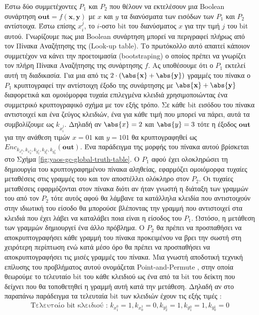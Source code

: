 Έστω δύο συμμετέχοντες $P_1$ και $P_2$ που θέλουν να εκτελέσουν μια Boolean συνάρτηση $\mathbf{out} = f(\mathbf{x}, \mathbf{y})$ με $x$ και $y$ τα διανύσματα των εισόδων των $P_1$ και $P_2$ αντίστοιχα. Έστω επίσης $x_i^j$, το $i$-οστο bit του διανύσματος $x$ για την τιμή $j$ του bit αυτού.  Γνωρίζουμε πως μια Boolean συνάρτηση μπορεί να περιγραφεί πλήρως από τον Πίνακα Αναζήτησης της (Look-up table). Το πρωτόκολλο αυτό απαιτεί κάποιον συμμετέχον να κάνει την προετοιμασία (bootstraping) ο οποίος πρέπει να γνωρίζει τον πλήρη Πίνακα Αναζήτησης της συνάρτησης $f$. Ας υποθέσουμε ότι ο $P_1$ εκτελεί αυτή τη διαδικασία. Για μια από τις $2 \cdot (\abs{\mathbf{x}} + \abs{\mathbf{y}})$ γραμμές του πίνακα ο $P_1$ κρυπτογραφεί την αντίστοιχη έξοδο της συνάρτησης με $ \abs{\mathbf{x}} + \abs{\mathbf{y}}$ διαφορετικά και ομοιόμορφα τυχαία επιλεγμένα κλειδιά χρησιμοποιώντας ένα συμμετρικό κρυπτογραφικό σχήμα με τον εξής τρόπο. Σε κάθε bit εισόδου του πίνακα αντιστοιχεί και ένα ζεύγος κλειδιών, ένα για κάθε τιμή που μπορεί να πάρει, αυτά τα συμβολίζουμε ως $k_{x_i^j}$. Δηλαδή αν $\abs{x}=2$ και $\abs{y}=3$ τότε η έξοδος $\mathbf{out}$ για την ανάθεση τιμών $x=01$ και $y=101$ θα κρυπτογραφηθεί ως $Enc_{k_{x_1^0}, k_{x_0^1}, k_{y_2^1}, k_{y_1^0}, k_{y_0^1}}(\mathbf{out})$. Ένα παράδειγμα της μορφής του πίνακα αυτού βρίσκεται στο Σχήμα \ref{fig:yaos-gc-global-truth-table}. Ο $P_1$ αφού έχει ολοκληρώσει τη δημιουργία του κρυπτογραφημένου πίνακα αληθείας, εφαρμόζει ομοιόμορφα τυχαίες μεταθέσεις στις γραμμές του και τον αποστέλλει ολόκληρο στον $P_2$. Οι τυχαίες μεταθέσεις εφαρμόζονται στον πίνακα διότι αν ήταν γνωστή η διάταξη των γραμμών του από τον $P_2$ τότε αυτός αφού θα λάμβανε τα κατάλληλα κλειδία που αντιστοιχούν στην ιδιωτική του είσοδο θα μπορούσε βλέποντας την γραμμή που αντιστοιχεί στα κλειδιά που έχει λάβει να καταλάβει ποια είναι η είσοδος του $P_1$. Ωστόσο, η μετάθεση των γραμμών δημιουργεί ένα άλλο πρόβλημα. Ο $P_2$ θα πρέπει να προσπαθήσει να αποκρυπτογραφήσει κάθε γραμμή του πίνακα προκειμένου να βρει την σωστή στη χειρότερη περίπτωση ενώ κατά μέσο όρο θα πρέπει να προσπαθήσει να αποκρυπτογραφήσει τις μισές γραμμές του πίνακα. Μια γνωστή αποδοτική τεχνική επίλυσης του προβλήματος αυτού ονομάζεται Point-and-Permute \cite{10.1145/100216.100287}, στην οποία θεωρούμε το τελευταίο bit του κάθε κλειδιού ως ένα από τα bit του δείκτη που δείχνει που θα τοποθετηθεί η γραμμή αυτή κατά την μετάθεση. Δηλαδή αν στο παραπάνω παράδειγμα τα τελευταία bit των κλειδιών έχουν τις εξής τιμές :
%
\begin{align*}
    \text{Τελευταίο bit κλειδιού : }k_{x_1^0} = 1, k_{x_0^1} = 0, k_{y_2^1} = 1, k_{y_1^0} = 1, k_{y_0^1} = 0
\end{align*}
